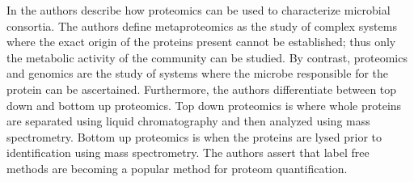 \documentclass[float=false, crop=false]{standalone}
\begin{document}
	In \cite{VerBerkmoes2009} the authors describe how proteomics can be used to characterize microbial consortia. The authors define metaproteomics as the study of complex systems where the exact origin of the proteins present cannot be established; thus only the metabolic activity of the community can be studied. By contrast, proteomics and genomics are the study of systems where the microbe responsible for the protein can be ascertained. Furthermore, the authors differentiate between top down and bottom up proteomics. Top down proteomics is where whole proteins are separated using liquid chromatography and then analyzed using mass spectrometry. Bottom up proteomics is when the proteins are lysed prior to identification using mass spectrometry. The authors assert that label free methods are becoming a popular method for proteom quantification. 

	\ifstandalone
			
		
	\fi
\end{document}
